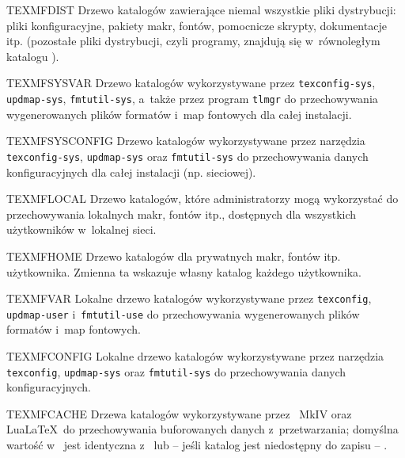 \documentclass{article}
\begin{document}
\begin{ttdescription}
\item [TEXMFDIST] Drzewo katalogów zawierające niemal wszystkie pliki
 dystrybucji: pliki konfiguracyjne, pakiety makr, fontów, pomocnicze skrypty, dokumentacje itp.
 (pozostałe pliki dystrybucji, czyli programy, znajdują się w~równoległym
 katalogu ).
 \item [TEXMFSYSVAR] Drzewo katalogów wykorzystywane przez
 \verb+texconfig-sys+, \verb+updmap-sys+, \verb+fmtutil-sys+, a~także
 przez program \verb+tlmgr+ do przechowywania wygenerowanych plików
 formatów i~map fontowych dla całej instalacji.
 \item [TEXMFSYSCONFIG] Drzewo katalogów wykorzystywane przez narzędzia
 \verb+texconfig-sys+, \verb+updmap-sys+ oraz \verb+fmtutil-sys+
 do przechowywania danych konfiguracyjnych dla całej instalacji (np.
 sieciowej).
 \item [TEXMFLOCAL] Drzewo katalogów, które administratorzy mogą wykorzystać
 do przechowywania lokalnych makr, fontów itp., dostępnych dla wszystkich
 użytkowników w~lokalnej sieci.
\item [TEXMFHOME] Drzewo katalogów dla prywatnych makr, fontów itp.
 użytkownika. %
 Zmienna ta wskazuje  własny katalog każdego użytkownika.
\item [TEXMFVAR] Lokalne drzewo katalogów wykorzystywane przez \verb+texconfig+,
 \verb+updmap-user+ i~\verb+fmtutil-use+ do przechowywania wygenerowanych plików
 formatów i~map fontowych.%
\item [TEXMFCONFIG] Lokalne drzewo katalogów wykorzystywane przez narzędzia
 \verb+texconfig+, \verb+updmap-sys+ oraz \verb+fmtutil-sys+ do przechowywania
 danych konfiguracyjnych.%
\item [TEXMFCACHE] Drzewa katalogów wykorzystywane przez \ConTeXt\
  MkIV oraz Lua\LaTeX\ do przechowywania buforowanych danych
  z~przetwarzania; domyślna wartość w~\TL{} jest identyczna
  z~ lub -- jeśli katalog jest niedostępny do zapisu
  -- \code{TEXMFVAR}.
\end{ttdescription}
\end{document}
